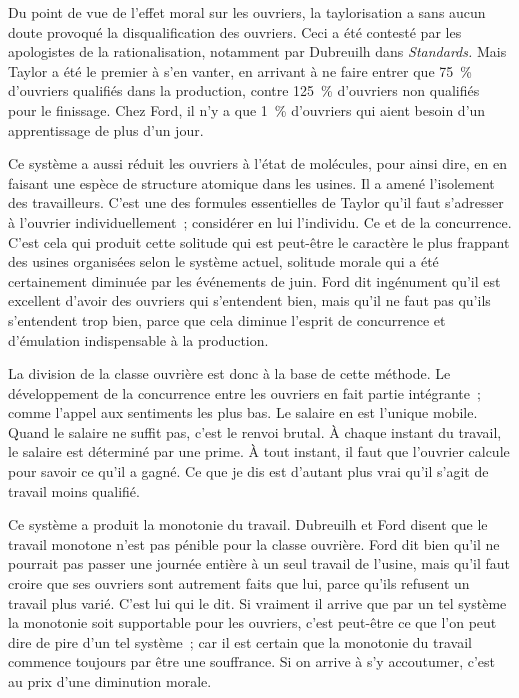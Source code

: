 \documentclass[french,twoside]{book} %
\begin{document}
Du point de vue de l'effet moral sur les ouvriers, la taylorisation a sans aucun doute provoqué la disqualification des ouvriers. Ceci a été contesté par les apologistes de la rationalisation, notamment par Dubreuilh dans {\itshape Standards.} Mais Taylor a été le premier à s'en vanter, en arrivant à ne faire entrer que 75 \% d'ouvriers qualifiés dans la production, contre 125 \% d'ouvriers non qualifiés pour le finissage. Chez Ford, il n'y a que 1 \% d'ouvriers qui aient besoin d'un apprentissage de plus d'un jour.\par
Ce système a aussi réduit les ouvriers à l'état de molécules, pour ainsi dire, en en faisant une espèce de structure atomique dans les usines. Il a amené l'isolement des travailleurs. C'est une des formules essentielles de Taylor qu'il faut s'adresser à l'ouvrier individuellement ; considérer en lui l'individu. Ce et de la concurrence. C'est cela qui produit cette solitude qui est peut-être le caractère le plus frappant des usines organisées selon le système actuel, solitude morale qui a été certainement diminuée par les événements de juin. Ford dit ingénument qu'il est excellent d'avoir des ouvriers qui s'entendent bien, mais qu'il ne faut pas qu'ils s'entendent trop bien, parce que cela diminue l'esprit de concurrence et d'émulation indispensable à la production.\par
\par
La division de la classe ouvrière est donc à la base de cette méthode. Le développement de la concurrence entre les ouvriers en fait partie intégrante ; comme l'appel aux sentiments les plus bas. Le salaire en est l'unique mobile. Quand le salaire ne suffit pas, c'est le renvoi brutal. À chaque instant du travail, le salaire est déterminé par une prime. À tout instant, il faut que l'ouvrier calcule pour savoir ce qu'il a gagné. Ce que je dis est d'autant plus vrai qu'il s'agit de travail moins qualifié.\par
Ce système a produit la monotonie du travail. Dubreuilh et Ford disent que le travail monotone n'est pas pénible pour la classe ouvrière. Ford dit bien qu'il ne pourrait pas passer une journée entière à un seul travail de l'usine, mais qu'il faut croire que ses ouvriers sont autrement faits que lui, parce qu'ils refusent un travail plus varié. C'est lui qui le dit. Si vraiment il arrive que par un tel système la monotonie soit supportable pour les ouvriers, c'est peut-être ce que l'on peut dire de pire d'un tel système ; car il est certain que la monotonie du travail commence toujours par être une souffrance. Si on arrive à s’y accoutumer, c'est au prix d'une diminution morale.\par
\end{document}
